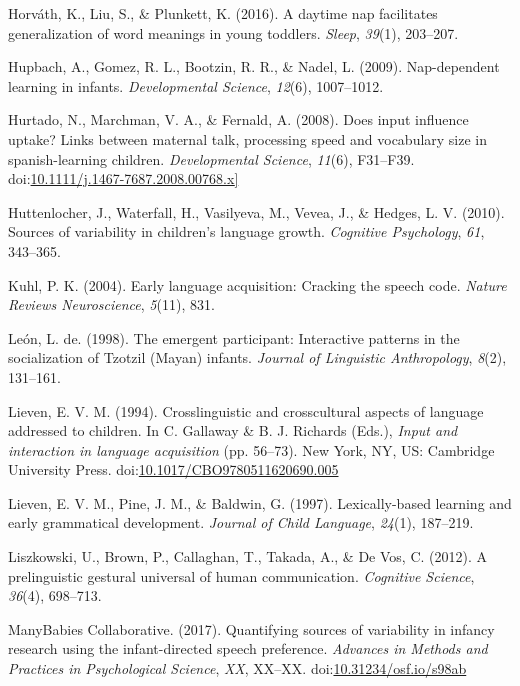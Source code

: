 \documentclass[floatsintext,man]{apa6}
\theoremstyle{definition}
\theoremstyle{definition}
\theoremstyle{definition}
\theoremstyle{remark}
\begin{document}
\hypertarget{ref-horvath2016daytime}{}
Horváth, K., Liu, S., \& Plunkett, K. (2016). A daytime nap facilitates
generalization of word meanings in young toddlers. \emph{Sleep},
\emph{39}(1), 203--207.

\hypertarget{ref-hupbach2009nap}{}
Hupbach, A., Gomez, R. L., Bootzin, R. R., \& Nadel, L. (2009).
Nap-dependent learning in infants. \emph{Developmental Science},
\emph{12}(6), 1007--1012.

\hypertarget{ref-hurtado2008does}{}
Hurtado, N., Marchman, V. A., \& Fernald, A. (2008). Does input
influence uptake? Links between maternal talk, processing speed and
vocabulary size in spanish-learning children. \emph{Developmental
Science}, \emph{11}(6), F31--F39.
doi:\href{https://doi.org/10.1111/j.1467-7687.2008.00768.x\%5D}{10.1111/j.1467-7687.2008.00768.x{]}}

\hypertarget{ref-huttenlocher2010sources}{}
Huttenlocher, J., Waterfall, H., Vasilyeva, M., Vevea, J., \& Hedges, L.
V. (2010). Sources of variability in children's language growth.
\emph{Cognitive Psychology}, \emph{61}, 343--365.

\hypertarget{ref-kuhl2004early}{}
Kuhl, P. K. (2004). Early language acquisition: Cracking the speech
code. \emph{Nature Reviews Neuroscience}, \emph{5}(11), 831.

\hypertarget{ref-deleon1998emergent}{}
León, L. de. (1998). The emergent participant: Interactive patterns in
the socialization of Tzotzil (Mayan) infants. \emph{Journal of
Linguistic Anthropology}, \emph{8}(2), 131--161.

\hypertarget{ref-lieven1994crosslinguistic}{}
Lieven, E. V. M. (1994). Crosslinguistic and crosscultural aspects of
language addressed to children. In C. Gallaway \& B. J. Richards (Eds.),
\emph{Input and interaction in language acquisition} (pp. 56--73). New
York, NY, US: Cambridge University Press.
doi:\href{https://doi.org/10.1017/CBO9780511620690.005}{10.1017/CBO9780511620690.005}

\hypertarget{ref-lieven1997lexically}{}
Lieven, E. V. M., Pine, J. M., \& Baldwin, G. (1997). Lexically-based
learning and early grammatical development. \emph{Journal of Child
Language}, \emph{24}(1), 187--219.

\hypertarget{ref-liszkowski2012prelinguistic}{}
Liszkowski, U., Brown, P., Callaghan, T., Takada, A., \& De Vos, C.
(2012). A prelinguistic gestural universal of human communication.
\emph{Cognitive Science}, \emph{36}(4), 698--713.

\hypertarget{ref-manybabies2017}{}
ManyBabies Collaborative. (2017). Quantifying sources of variability in
infancy research using the infant-directed speech preference.
\emph{Advances in Methods and Practices in Psychological Science},
\emph{XX}, XX--XX.
doi:\href{https://doi.org/10.31234/osf.io/s98ab}{10.31234/osf.io/s98ab}
\end{document}
